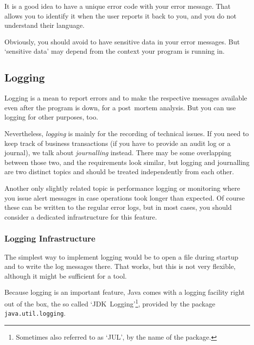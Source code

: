 \documentclass[11pt,a4paper, titlepage, parskip=half, headsepline, footsepline, cleardoublepage=current, headheight=1cm]{scrbook}
\begin{document}
It is a good idea to have a unique error code with your error message. That allows you to identify it when the user reports it back to you, and you do not understand their language. 

Obviously, you should avoid to have sensitive data in your error messages. But ‘sensitive data’ may depend from the context your program is running in.


\subsection{Logging}\label{sec:Logging}
Logging is a mean to report errors and to make the respective messages available even after the program is down, for a post~mortem analysis. But you can use logging for other purposes, too.

Nevertheless, \textit{logging} is mainly for the recording of technical issues. If you need to keep track of business transactions (if you have to provide an audit log or a journal), we talk about \textit{journalling} instead. There may be some overlapping between those two, and the requirements look similar, but logging and journalling are two distinct topics and should be treated independently from each other.

Another only slightly related topic is performance logging or monitoring where you issue alert messages in case operations took longer than expected. Of course these can be written to the regular error logs, but in most cases, you should consider a dedicated infrastructure for this feature.


\subsubsection{Logging Infrastructure}
The simplest way to implement logging would be to open a file during startup and to write the log messages there. That works, but this is not very flexible, although it might be sufficient for a tool.

Because logging is an important feature, Java comes with a logging facility right out of the box, the so called ‘JDK~Logging’\footnote{Sometimes also referred to as ‘JUL’, by the name of the package.}, provided by the package \lstinline|java.util.logging|\autocite{ORACLE_DOC_LOGGING_PACKAGE, ORACLE_DOC_LOGGING_OVERVIEW}.
\end{document}
